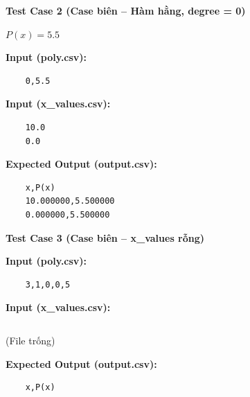     \vspace{0.5cm}

    \textbf{Test Case 2 (Case biên -- Hàm hằng, degree = 0)}
    
    $P(x) = 5.5$
    
    \textbf{Input (poly.csv):}
    \begin{lstlisting}
    0,5.5\end{lstlisting}
    \textbf{Input (x\_values.csv):}
    \begin{lstlisting}
    10.0
    0.0\end{lstlisting}
    \textbf{Expected Output (output.csv):}
    \begin{lstlisting}
    x,P(x)
    10.000000,5.500000
    0.000000,5.500000\end{lstlisting}

    \vspace{0.5cm}
    
    \textbf{Test Case 3 (Case biên -- x\_values rỗng)}

    \textbf{Input (poly.csv):}
    \begin{lstlisting}
    3,1,0,0,5\end{lstlisting}
    \textbf{Input (x\_values.csv):}
    \begin{lstlisting}
    \end{lstlisting}
    (File trống)
    
    \textbf{Expected Output (output.csv):}
    \begin{lstlisting}
    x,P(x)\end{lstlisting}